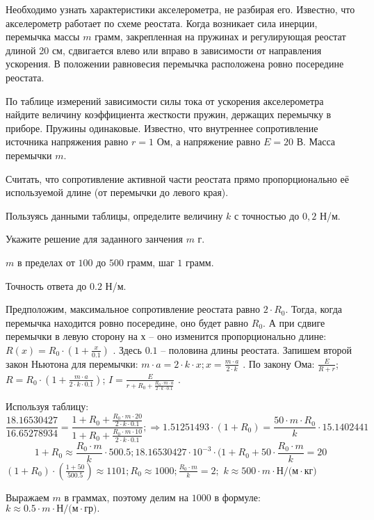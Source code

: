 Необходимо узнать характеристики
акселерометра, не разбирая его. Известно, что акселерометр работает по схеме реостата. Когда возникает сила инерции,
перемычка массы $m$ грамм, закрепленная на пружинах и регулирующая реостат длиной
20 см, сдвигается влево или
вправо в зависимости от направления ускорения. В положении равновесия перемычка
расположена ровно посередине реостата.


По таблице измерений зависимости силы тока от
ускорения акселерометра найдите величину коэффициента жесткости пружин, держащих перемычку в приборе. Пружины
одинаковые. Известно, что
внутреннее сопротивление источника напряжения равно $r = 1$ Ом, а напряжение равно $E = 20$ В.  Масса
перемычки $m$.


Считать, что сопротивление активной части реостата прямо
пропорционально её используемой длине (от перемычки до левого края).

Пользуясь данными таблицы, определите величину $k$ с точностью до $0,2$ Н/м.

Укажите решение для заданного занчения $m$ г.

\paramSection

$m$ в пределах от $100$ до $500$ грамм, шаг $1$ грамм.  

Точность ответа  до  $0.2$  Н/м.

\solutionSection

Предположим, максимальное сопротивление реостата равно $2 \cdot R_0$. Тогда, когда перемычка находится 
ровно посередине, оно будет равно $R_0$. А при сдвиге перемычки в левую сторону на $х$ – оно изменится 
пропорционально длине: \linebreak $R(x)=R_0 \cdot (1+\frac{x}{0.1})$ . Здесь $0.1$ – половина длины реостата. 
Запишем второй закон Ньютона для перемычки:
$m \cdot a=2 \cdot k \cdot x;  x=\frac{m \cdot a}{2 \cdot k}$   . По закону Ома:   
$\frac{E}{R+r}$; $R=R_0 \cdot \left(1+\frac{m \cdot a}{2 \cdot k \cdot 0.1}\right)$; 
$I=  \frac{E}{r+R_0+\frac{R_0 \cdot m \cdot a}{2 \cdot k \cdot 0.1}}$ . 

Используя таблицу:
$$\frac{18.16530427}{16.65278934}=\frac{1+R_0+\frac{R_0 \cdot m \cdot 20}{2 \cdot k \cdot 0.1}}{1+R_0+\frac{R_0 \cdot m \cdot 10}{2 \cdot k \cdot 0.1}}; \Rightarrow  1.51251493 \cdot (1+R_0 )=\frac{50 \cdot m \cdot R_0}{k} \cdot 15.1402441$$
$$1+R_0 \approx   \frac{R_0 \cdot m}{k}   \cdot 500.5;  18.16530427 \cdot 10^{-3} \cdot (1+R_0+50 \cdot \frac{R_0 \cdot m}{k}=20$$
$(1+R_0 ) \cdot \left(\frac{1+50}{500.5}\right) \approx 1101;  R_0 \approx 1000;   \frac{R_0 \cdot m}{k}=2;$ 
$k \approx 500 \cdot m \cdot \text{Н/(м} \cdot \text{кг}) $  

Выражаем $m$ в граммах, поэтому делим на $1000$ в формуле:  $k \approx 0.5 \cdot m \cdot \text{Н/(м} \cdot \text{гр)}   .$

